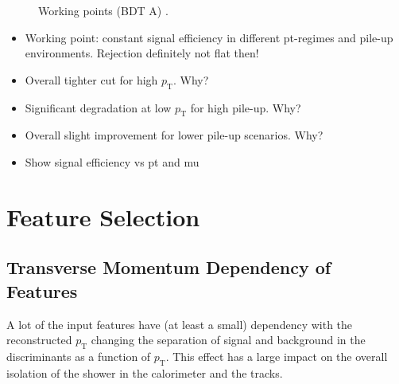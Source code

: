\begin{figure}[ht]
\begin{subfigure}[t]{0.48\textwidth}
  \end{subfigure}
  \caption{Working points (BDT A) .
    }
\end{figure}


\begin{itemize}
\item Working point: constant signal efficiency in different pt-regimes and
  pile-up environments. Rejection definitely not flat then!
\item Overall tighter cut for high $p_\text{T}$. Why?
\item Significant degradation at low $p_\text{T}$ for high pile-up. Why?
\item Overall slight improvement for lower pile-up scenarios. Why?
\item Show signal efficiency vs pt and mu
\end{itemize}

\section{Feature Selection}
\label{sec:bdt_feature_selection}

\subsection{Transverse Momentum Dependency of Features}
\label{sec:bdt_incl_pt}

A lot of the input features have (at least a small) dependency with the
reconstructed $p_\text{T}$ changing the separation of signal and background in
the discriminants as a function of $p_\text{T}$. This effect has a large impact
on the overall isolation of the shower in the calorimeter and the tracks.

